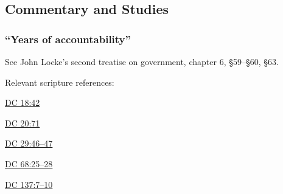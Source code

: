 \subsection{Commentary and Studies} %
	\label{ACCOUNTABILITY-COMMENTARY}

	
		
	\subsubsection{``Years of accountability''}
		\label{ACCOUNTABILITY-study}
		
		See John Locke's second treatise on government, chapter 6, \S59--\S60, \S63.
		
		Relevant scripture references:
		
			\begin{compactitem}
				\item \hyperref[DC18-42]{DC 18:42}
				\item \hyperref[DC20-71]{DC 20:71}
				\item \hyperref[DC29-46]{DC 29:46--47}
				\item \hyperref[DC68-25]{DC 68:25--28}
				\item \hyperref[DC137-7]{DC 137:7--10}
			\end{compactitem}